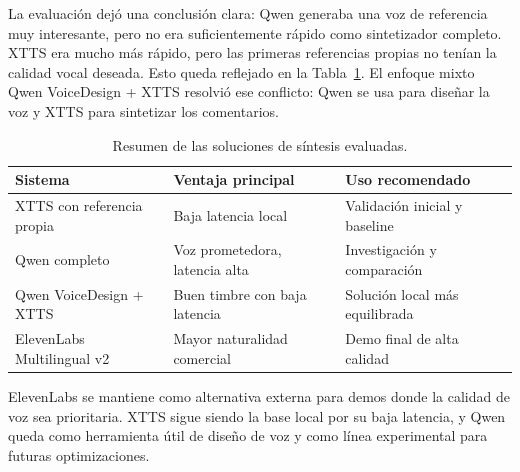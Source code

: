 La evaluación dejó una conclusión clara: Qwen generaba una voz de referencia muy interesante, pero no era suficientemente rápido como sintetizador completo. XTTS era mucho más rápido, pero las primeras referencias propias no tenían la calidad vocal deseada. Esto queda reflejado en la Tabla~\ref{tab:soluciones-sintesis}. El enfoque mixto Qwen VoiceDesign + XTTS resolvió ese conflicto: Qwen se usa para diseñar la voz y XTTS para sintetizar los comentarios.

\begin{table}[ht]
\centering
\begin{tabular}{lll}
\toprule
Sistema & Ventaja principal & Uso recomendado \\
\midrule
XTTS con referencia propia & Baja latencia local & Validación inicial y baseline \\
Qwen completo & Voz prometedora, latencia alta & Investigación y comparación \\
Qwen VoiceDesign + XTTS & Buen timbre con baja latencia & Solución local más equilibrada \\
ElevenLabs Multilingual v2 & Mayor naturalidad comercial & Demo final de alta calidad \\
\bottomrule
\end{tabular}
\caption{Resumen de las soluciones de síntesis evaluadas.}
\label{tab:soluciones-sintesis}
\end{table}

ElevenLabs se mantiene como alternativa externa para demos donde la calidad de voz sea prioritaria. XTTS sigue siendo la base local por su baja latencia, y Qwen queda como herramienta útil de diseño de voz y como línea experimental para futuras optimizaciones.
